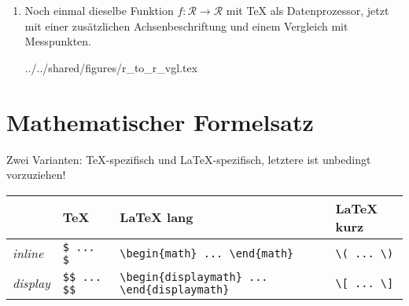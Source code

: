 \documentclass[ngerman,               %
               a4paper,               %
               fleqn,                 %
                     ]{scrartcl}       %
\begin{document}
\begin{enumerate}
    

  \item Noch einmal dieselbe Funktion
    \(f: \mathcal R \rightarrow \mathcal R\) mit \TeX{} als Datenprozessor,
    jetzt mit einer zusätzlichen Achsenbeschriftung und einem Vergleich mit
    Messpunkten.
\begin{verbatimwrite}{../../shared/figures/r_to_r_vgl.tex}
\end{verbatimwrite}
    

    
\end{enumerate}


\section{Mathematischer Formelsatz}

Zwei Varianten: \TeX-spezifisch und \LaTeX-spezifisch, letztere ist unbedingt
vorzuziehen!

\begin{tabular}{llll}
  \toprule
  & \TeX & \LaTeX{} lang & \LaTeX{} kurz\\
  \midrule
  \textit{inline} & \lstinline|$ ... $| & \lstinline|\begin{math} ... \end{math}| & \lstinline|\( ... \)| \\
  \textit{display} & \lstinline|$$ ... $$| & \lstinline|\begin{displaymath} ... \end{displaymath}|& \lstinline|\[ ... \]| \\
  \bottomrule
\end{tabular}
\end{document}
